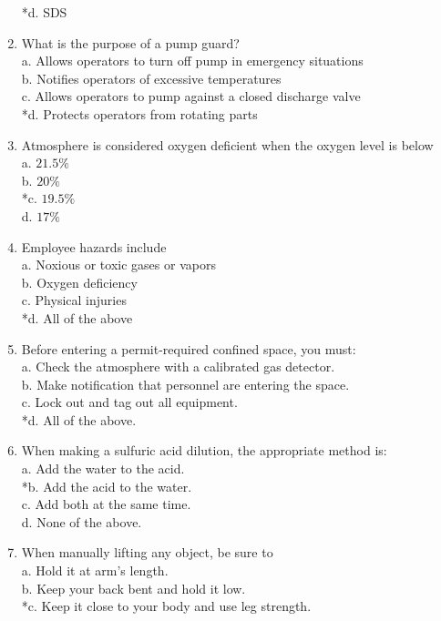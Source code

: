 \begin{enumerate}[1.]
*d. SDS\\
\item What is the purpose of a pump guard?\\
a. Allows operators to turn off pump in emergency situations\\
b. Notifies operators of excessive temperatures\\
c. Allows operators to pump against a closed discharge valve\\
*d. Protects operators from rotating parts\\
\item Atmosphere is considered oxygen deficient when the oxygen level is below\\
a. $21.5 \%$\\
b. $20 \%$\\
*c. $19.5 \%$\\
d. $17 \%$\\
\item Employee hazards include\\
a. Noxious or toxic gases or vapors\\
b. Oxygen deficiency\\
c. Physical injuries\\
*d. All of the above\\
\item Before entering a permit-required confined space, you must:\\
a. Check the atmosphere with a calibrated gas detector.\\
b. Make notification that personnel are entering the space.\\
c. Lock out and tag out all equipment.\\
*d. All of the above.\\
\item When making a sulfuric acid dilution, the appropriate method is:\\
a. Add the water to the acid.\\
*b. Add the acid to the water.\\
c. Add both at the same time.\\
d. None of the above.\\
\item When manually lifting any object, be sure to\\
a. Hold it at arm's length.\\
b. Keep your back bent and hold it low.\\
*c. Keep it close to your body and use leg strength.\\

\end{enumerate}
